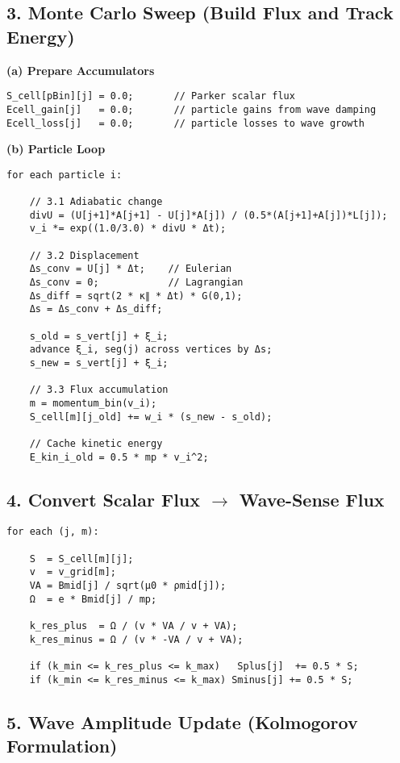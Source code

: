 \subsection*{3. Monte Carlo Sweep (Build Flux and Track Energy)}

\textbf{(a) Prepare Accumulators}
\begin{lstlisting}
S_cell[pBin][j] = 0.0;       // Parker scalar flux
Ecell_gain[j]   = 0.0;       // particle gains from wave damping
Ecell_loss[j]   = 0.0;       // particle losses to wave growth
\end{lstlisting}

\textbf{(b) Particle Loop}
\begin{lstlisting}
for each particle i:

    // 3.1 Adiabatic change
    divU = (U[j+1]*A[j+1] - U[j]*A[j]) / (0.5*(A[j+1]+A[j])*L[j]);
    v_i *= exp((1.0/3.0) * divU * Δt);

    // 3.2 Displacement
    Δs_conv = U[j] * Δt;    // Eulerian
    Δs_conv = 0;            // Lagrangian
    Δs_diff = sqrt(2 * κ∥ * Δt) * G(0,1);
    Δs = Δs_conv + Δs_diff;

    s_old = s_vert[j] + ξ_i;
    advance ξ_i, seg(j) across vertices by Δs;
    s_new = s_vert[j] + ξ_i;

    // 3.3 Flux accumulation
    m = momentum_bin(v_i);
    S_cell[m][j_old] += w_i * (s_new - s_old);

    // Cache kinetic energy
    E_kin_i_old = 0.5 * mp * v_i^2;
\end{lstlisting}

\subsection*{4. Convert Scalar Flux $\rightarrow$ Wave-Sense Flux}

\begin{lstlisting}
for each (j, m):

    S  = S_cell[m][j];
    v  = v_grid[m];
    VA = Bmid[j] / sqrt(μ0 * ρmid[j]);
    Ω  = e * Bmid[j] / mp;

    k_res_plus  = Ω / (v * VA / v + VA);
    k_res_minus = Ω / (v * -VA / v + VA);

    if (k_min <= k_res_plus <= k_max)   Splus[j]  += 0.5 * S;
    if (k_min <= k_res_minus <= k_max) Sminus[j] += 0.5 * S;
\end{lstlisting}

\subsection*{5. Wave Amplitude Update (Kolmogorov Formulation)}

